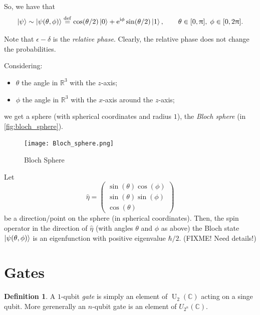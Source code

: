 \documentclass[12pt]{amsart}
\theoremstyle{plain}
\theoremstyle{definition}
\newtheorem{definition}[theorem]{Definition}
\theoremstyle{remark}
\newcommand{\R}{\mathbb{R}}
\newcommand{\C}{\mathbb{C}}
\newcommand{\me}{\mathrm{e}}
\newcommand{\mi}{\mathrm{i}}
\newcommand{\mpi}{\uppi}
\newcommand{\idef}{\overset{{\rm def}}{=}}
\DeclareMathOperator{\U}{U}  %
\begin{document}
So, we have that
\begin{equation}\label{eq:bloch_coord}
  \ket{\psi} \sim \ket{\psi(\theta, \phi)} \idef \cos(\theta/2) \ket{0} + \me^{\mi \phi} \sin(\theta/2) \ket{1}, \qquad \theta \in [0, \mpi], \; \phi \in [0, 2 \mpi].
\end{equation}

Note that $\epsilon - \delta$ is the \emph{relative phase}.  Clearly, the relative phase does not change the probabilities.

Considering:
\begin{itemize}

\item $\theta$ the angle in $\R^3$ with the $z$-axis;

\item $\phi$ the angle in $\R^3$ with the $x$-axis around the $z$-axis;

\end{itemize}
we get a sphere (with spherical coordinates and radius $1$), the \emph{Bloch sphere} (in \vref{fig:bloch_sphere}).

\begin{figure}\centering

  \texttt{[image: Bloch\_sphere.png]}

  \caption{Bloch Sphere}\label{fig:bloch_sphere}
\end{figure}

Let
\[
  \hat{\eta} = \begin{pmatrix}
    \sin(\theta)\cos(\phi) \\
    \sin(\theta)\sin(\phi) \\
    \cos(\theta)
  \end{pmatrix}
\]
be a direction/point on the sphere (in spherical coordinates).  Then, the spin operator in the direction of $\hat{\eta}$ (with angles $\theta$ and $\phi$ as above) the Bloch state $\ket{\psi(\theta, \phi)}$ is an eigenfunction with positive eigenvalue $\hbar/2$.  (FIXME!  Need details!)


\section{Gates}

\begin{definition}
  A $1$-qubit \emph{gate} is simply an element of $\U_2(\C)$ acting on a singe qubit.  More gerenerally an $n$-qubit gate is an element of $U_{2^n}(\C)$.
\end{definition}
\end{document}
